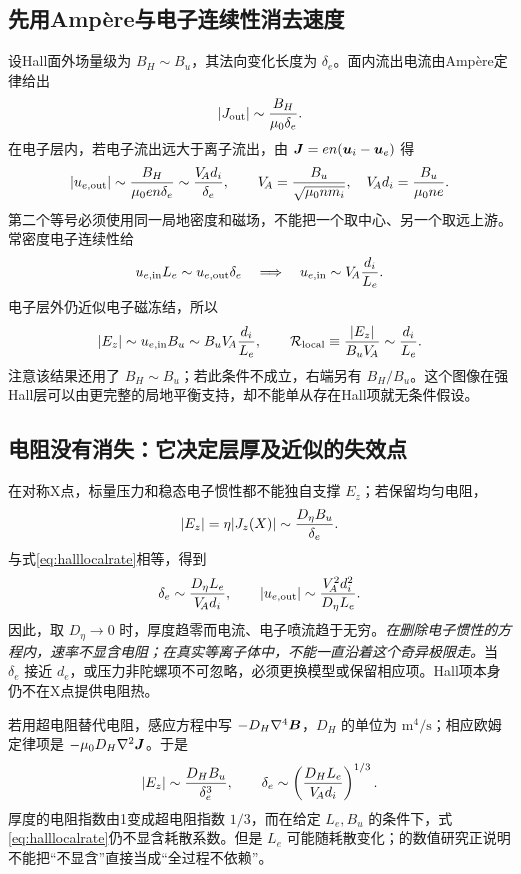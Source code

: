 \documentclass[UTF8,a4paper,11pt,openany,fontset=fandol]{ctexbook}
\begin{document}
\subsection{先用Ampère与电子连续性消去速度}
设Hall面外场量级为 $B_H\sim B_u$，其法向变化长度为 $\delta_e$。面内流出电流由Ampère定律给出
\begin{equation}
|J_{\rm out}|\sim{B_H\over\mu_0\delta_e}.
\end{equation}
在电子层内，若电子流出远大于离子流出，由 $\bm{J}=en(\bm{u}_i-\bm{u}_e)$ 得
\begin{equation}
|u_{e,\rm out}|\sim{B_H\over\mu_0en\delta_e}
\sim {V_{\!A}d_i\over\delta_e},\qquad
V_{\!A}={B_u\over\sqrt{\mu_0nm_i}},\quad
V_{\!A} d_i={B_u\over\mu_0ne}.
\end{equation}
第二个等号必须使用同一局地密度和磁场，不能把一个取中心、另一个取远上游。常密度电子连续性给
\begin{equation}
u_{e,\rm in}L_e\sim u_{e,\rm out}\delta_e
\quad\Longrightarrow\quad
u_{e,\rm in}\sim V_{\!A}{d_i\over L_e}.
\end{equation}
电子层外仍近似电子磁冻结，所以
\begin{equation}
|E_z|\sim u_{e,\rm in}B_u
\sim B_uV_{\!A}{d_i\over L_e},\qquad
\mathcal R_{\rm local}\equiv{|E_z|\over B_uV_{\!A}}\sim {d_i\over L_e}.
\label{eq:halllocalrate}
\end{equation}
注意该结果还用了 $B_H\sim B_u$；若此条件不成立，右端另有 $B_H/B_u$。这个图像在强Hall层可以由更完整的局地平衡支持，却不能单从存在Hall项就无条件假设。

\subsection{电阻没有消失：它决定层厚及近似的失效点}
在对称X点，标量压力和稳态电子惯性都不能独自支撑 $E_z$；若保留均匀电阻，
\begin{equation}
|E_z|=\eta|J_z(X)|\sim {D_\eta B_u\over\delta_e}.
\end{equation}
与式\eqref{eq:halllocalrate}相等，得到
\begin{equation}
\delta_e\sim{D_\eta L_e\over V_{\!A}d_i},\qquad
|u_{e,\rm out}|\sim{V_{\!A}^2d_i^2\over D_\eta L_e}.
\label{eq:hallthickness}
\end{equation}
因此，取 $D_\eta\to0$ 时，厚度趋零而电流、电子喷流趋于无穷。\emph{在删除电子惯性的方程内，速率不显含电阻；在真实等离子体中，不能一直沿着这个奇异极限走。}当 $\delta_e$ 接近 $d_e$，或压力非陀螺项不可忽略，必须更换模型或保留相应项。Hall项本身仍不在X点提供电阻热。

若用超电阻替代电阻，感应方程中写 $-D_H\nabla^4\bm{B}$，$D_H$ 的单位为 $\mathrm{m^4/s}$；相应欧姆定律项是 $-\mu_0D_H\nabla^2\bm{J}$。于是
\begin{equation}
|E_z|\sim {D_HB_u\over\delta_e^3},\qquad
\delta_e\sim\left({D_HL_e\over V_{\!A} d_i}\right)^{1/3}.
\end{equation}
厚度的电阻指数由1变成超电阻指数 $1/3$，而在给定 $L_e,B_u$ 的条件下，式\eqref{eq:halllocalrate}仍不显含耗散系数。但是 $L_e$ 可能随耗散变化；\citet{Sullivan2009}的数值研究正说明不能把“不显含”直接当成“全过程不依赖”。
\end{document}
